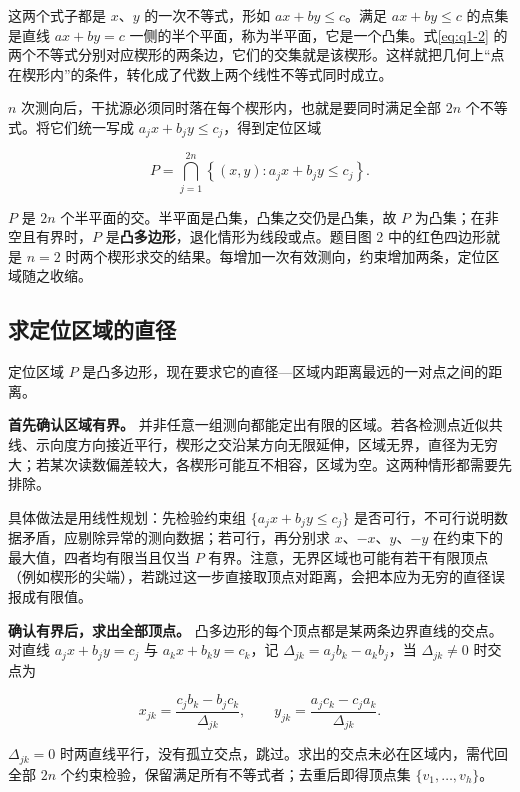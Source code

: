 这两个式子都是 $x$、$y$ 的一次不等式，形如 $ax+by\le c$。满足 $ax+by\le c$ 的点集是直线 $ax+by=c$ 一侧的半个平面，称为半平面，它是一个凸集。式\eqref{eq:q1-2} 的两个不等式分别对应楔形的两条边，它们的交集就是该楔形。这样就把几何上“点在楔形内”的条件，转化成了代数上两个线性不等式同时成立。

$n$ 次测向后，干扰源必须同时落在每个楔形内，也就是要同时满足全部 $2n$ 个不等式。将它们统一写成 $a_jx+b_jy\le c_j$，得到定位区域

\begin{equation}\label{eq:q1-3}
P=\bigcap_{j=1}^{2n}\left\{(x,y):a_jx+b_jy\le c_j\right\}.
\end{equation}

$P$ 是 $2n$ 个半平面的交。半平面是凸集，凸集之交仍是凸集，故 $P$ 为凸集；在非空且有界时，$P$ 是\textbf{凸多边形}，退化情形为线段或点。题目图 2 中的红色四边形就是 $n=2$ 时两个楔形求交的结果。每增加一次有效测向，约束增加两条，定位区域随之收缩。

\subsection{求定位区域的直径}\label{sec:q1-2}

定位区域 $P$ 是凸多边形，现在要求它的直径---区域内距离最远的一对点之间的距离。

\textbf{首先确认区域有界。} 并非任意一组测向都能定出有限的区域。若各检测点近似共线、示向度方向接近平行，楔形之交沿某方向无限延伸，区域无界，直径为无穷大；若某次读数偏差较大，各楔形可能互不相容，区域为空。这两种情形都需要先排除。

具体做法是用线性规划：先检验约束组 $\{a_jx+b_jy\le c_j\}$ 是否可行，不可行说明数据矛盾，应剔除异常的测向数据；若可行，再分别求 $x$、$-x$、$y$、$-y$ 在约束下的最大值，四者均有限当且仅当 $P$ 有界。注意，无界区域也可能有若干有限顶点（例如楔形的尖端），若跳过这一步直接取顶点对距离，会把本应为无穷的直径误报成有限值。

\textbf{确认有界后，求出全部顶点。} 凸多边形的每个顶点都是某两条边界直线的交点。对直线 $a_jx+b_jy=c_j$ 与 $a_kx+b_ky=c_k$，记 $\Delta_{jk}=a_jb_k-a_kb_j$，当 $\Delta_{jk}\ne0$ 时交点为

\begin{equation}\label{eq:q1-4}
x_{jk}=\frac{c_jb_k-b_jc_k}{\Delta_{jk}},\qquad
y_{jk}=\frac{a_jc_k-c_ja_k}{\Delta_{jk}}.
\end{equation}

$\Delta_{jk}=0$ 时两直线平行，没有孤立交点，跳过。求出的交点未必在区域内，需代回全部 $2n$ 个约束检验，保留满足所有不等式者；去重后即得顶点集 $\{v_1,\dots,v_h\}$。

